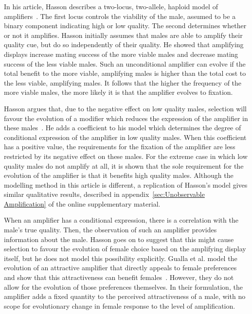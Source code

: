 \documentclass[a4paper,12pt]{article}
\numberwithin{equation}{section}
\numberwithin{figure}{section}
\begin{document}
In his article, Hasson describes a two-locus, two-allele, haploid model of amplifiers~\cite{Hasson1989}. The first locus controls the viability of the male, assumed to be a binary component indicating high or low quality. The second determines whether or not it amplifies. Hasson initially assumes that males are able to amplify their quality cue, but do so independently of their quality. He showed that amplifying displays increase mating success of the more viable males and decrease mating success of the less viable males. Such an unconditional amplifier can evolve if the total benefit to the more viable, amplifying males is higher than the total cost to the less viable, amplifying males. It follows that the higher the frequency of the more viable males, the more likely it is that the amplifier evolves to fixation.

Hasson argues that, due to the negative effect on low quality males, selection will favour the evolution of a modifier which reduces the expression of the amplifier in these males~\cite{Hasson1989}. He adds a coefficient to his model which determines the degree of conditional expression of the amplifier in low quality males. When this coefficient has a positive value, the requirements for the fixation of the amplifier are less restricted by its negative effect on these males. For the extreme case in which low quality males do not amplify at all, it is shown that the sole requirement for the evolution of the amplifier is that it benefits high quality males. Although the modelling method in this article is different, a replication of Hasson's model gives similar qualitative results, described in appendix~\ref{sec:Unobservable Amplification} of the online supplementary material.

When an amplifier has a conditional expression, there is a correlation with the male's true quality. Then, the observation of such an amplifier provides information about the male. Hasson goes on to suggest that this might cause selection to favour the evolution of female choice based on the amplifying display itself, but he does not model this possibility explicitly. Gualla et al. model the evolution of an attractive amplifier that directly appeals to female preferences and show that this attractiveness can benefit females~\cite{Gualla2008}. However, they do not allow for the evolution of those preferences themselves. In their formulation, the amplifier adds a fixed quantity to the perceived attractiveness of a male, with no scope for evolutionary change in female response to the level of amplification.
\end{document}
